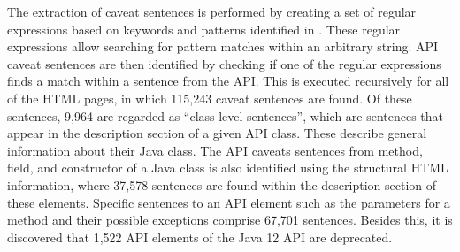 The extraction of caveat sentences is performed by creating a set of regular expressions based on keywords and patterns identified in \cite{caveat-knowledge-graph}. These regular expressions allow searching for pattern matches within an arbitrary string. API caveat sentences are then identified by checking if one of the regular expressions finds a match within a sentence from the API. This is executed recursively for all of the HTML pages, in which 115,243 caveat sentences are found. Of these sentences, 9,964 are regarded as ``class level sentences'', which are sentences that appear in the description section of a given API class. These describe general information about their Java class. The API caveats sentences from method, field, and constructor of a Java class is also identified using the structural HTML information, where 37,578 sentences are found within the description section of these elements. Specific sentences to an API element such as the parameters for a method and their possible exceptions comprise 67,701 sentences. Besides this, it is discovered that 1,522 API elements of the Java 12 API are deprecated. \\


